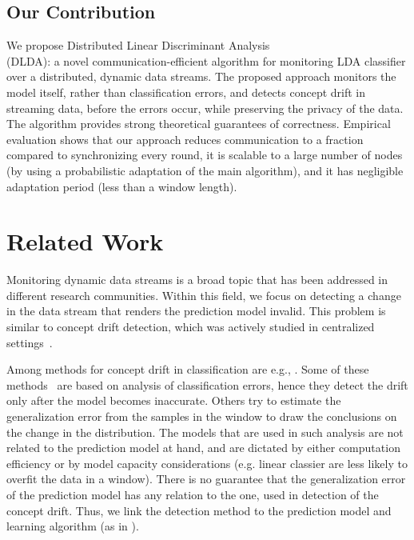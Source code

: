\documentclass{sig-alternate-05-2015}
\begin{document}
\subsection{Our Contribution}
We propose Distributed Linear Discriminant Analysis
\\ (DLDA): a novel communication-efficient algorithm for monitoring LDA classifier over a distributed, dynamic data streams.
The proposed approach monitors the model itself, rather than classification errors,
and detects concept drift in streaming data, before the errors occur, while  preserving the privacy of the data.
The algorithm provides strong theoretical guarantees of correctness.
Empirical evaluation shows that our approach reduces communication to a fraction compared to synchronizing every round, it is scalable to a large number of nodes (by using a probabilistic adaptation of the main algorithm), and it has negligible adaptation period (less than a window length).



\section{Related Work}
Monitoring dynamic data streams is a broad topic that has been addressed in different research communities. Within this field, we focus on detecting a change in the data stream that renders the prediction model invalid. This problem is similar to concept drift detection, which was actively studied in centralized settings~\cite{basseville1993detection,brodsky2013nonparametric,ChenGupta2000,Tsymbal,Gama2014}.

Among methods for concept drift in classification are e.g., \cite{gama2004learning,baena2006early,klinkenberg2000detecting,dries2009adaptive,icml2014c2_harel14,AngGZPH13}. Some of these methods~\cite{gama2004learning,baena2006early,klinkenberg2000detecting} are based on analysis of classification errors, hence they detect the drift only after the model becomes inaccurate. Others \cite{klinkenberg2000detecting,dries2009adaptive} try to estimate the generalization error from the samples in the window to draw the conclusions on the change in the distribution. The models that are used in such analysis are not related to the prediction model at hand, and are dictated by either computation efficiency \cite{klinkenberg2000detecting} or by model capacity considerations (e.g. linear classier are less likely to overfit the data in a window)\cite{dries2009adaptive}. There is no guarantee that the generalization error of the prediction model has any relation to the one, used in detection of the concept drift. Thus, we link the detection method to the prediction model and learning algorithm (as in \cite{icml2014c2_harel14,AngGZPH13}).
\end{document}
